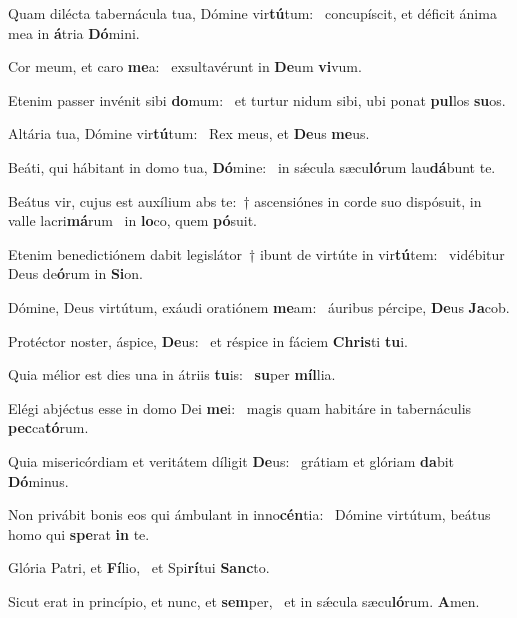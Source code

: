 \item Quam dilécta tabernácula tua, Dómine vir\textbf{tú}tum:~\psstar{} concupíscit, et déficit ánima mea in \textbf{á}tria \textbf{Dó}mini.
\item Cor meum, et caro \textbf{me}a:~\psstar{} exsultavérunt in \textbf{De}um \textbf{vi}vum.
\item Etenim passer invénit sibi \textbf{do}mum:~\psstar{} et turtur nidum sibi, ubi ponat \textbf{pul}los \textbf{su}os.
\item Altária tua, Dómine vir\textbf{tú}\-tum:~\psstar{} Rex meus, et \textbf{De}us \textbf{me}us.
\item Beáti, qui hábitant in domo tua, \textbf{Dó}mine:~\psstar{} in sǽcula sæcu\textbf{ló}rum lau\textbf{dá}bunt te.
\item Beátus vir, cujus est auxílium abs te:~† ascensiónes in corde suo dispósuit, in valle lacri\textbf{má}rum~\psstar{} in \textbf{lo}co, quem \textbf{pó}suit.
\item Etenim benedictiónem dabit legislátor~† ibunt de virtúte in vir\textbf{tú}tem:~\psstar{} vidébitur Deus de\textbf{ó}rum in \textbf{Si}on.
\item Dómine, Deus virtútum, exáudi oratiónem \textbf{me}am:~\psstar{} áuribus pércipe, \textbf{De}us \textbf{Ja}cob.
\item Protéctor noster, áspice, \textbf{De}us:~\psstar{} et réspice in fáciem \textbf{Chris}ti \textbf{tu}i.
\item Quia mélior est dies una in átriis \textbf{tu}is:~\psstar{} \textbf{su}per \textbf{míl}lia.
\item Elégi abjéctus esse in domo Dei \textbf{me}i:~\psstar{} magis quam habitáre in tabernáculis \textbf{pec}ca\textbf{tó}rum.
\item Quia misericórdiam et veritátem díligit \textbf{De}us:~\psstar{} grátiam et glóriam \textbf{da}bit \textbf{Dó}minus.
\item Non privábit bonis eos qui ámbulant in inno\textbf{cén}tia:~\psstar{} Dómine virtútum, beátus homo qui \textbf{spe}rat \textbf{in} te.
\item Glória Patri, et \textbf{Fí}lio,~\psstar{} et Spi\textbf{rí}tui \textbf{Sanc}to.
\item Sicut erat in princípio, et nunc, et \textbf{sem}per,~\psstar{} et in sǽcula sæcu\textbf{ló}rum. \textbf{A}men.
